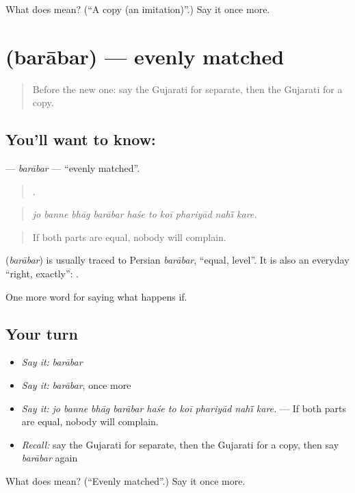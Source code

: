 \begin{tcolorbox}[breakable,colback=teal!4,colframe=teal!35!black,title={Before you move on}]
What does  mean? (\textquotedblleft{}A copy (an imitation)\textquotedblright{}.) Say it once more.
\end{tcolorbox}
\section[\texorpdfstring{\gu{બરાબર} (barābar)}{બરાબર (barābar)}]{ (barābar) — evenly matched}

\label{lesson:GU-C544-barabar}



\begin{quote}
Before the new one: say the Gujarati for separate, then the Gujarati for a copy.
\end{quote}

\subsection*{You'll want to know: }
\textbf{} — \emph{barābar} — \textquotedblleft{}evenly matched\textquotedblright{}.

\begin{quote}
         .
\end{quote}

\begin{quote}
\emph{jo banne bhāg barābar haśe to koī phariyād nahī̃ kare.}
\end{quote}

\begin{quote}
If both parts are equal, nobody will complain.
\end{quote}

\begin{cousinweb}
\textbf{} (\emph{barābar}) is usually traced to Persian \emph{barābar}, \textquotedblleft{}equal, level\textquotedblright{}. It is also an everyday \textquotedblleft{}right, exactly\textquotedblright{}: \textbf{ }.
\end{cousinweb}

\begin{grammarlens}[title={What you've built}]
One more word for saying what happens if.
\end{grammarlens}

\subsection*{Your turn}
\begin{itemize}
\raggedright
  \item \emph{Say it:} \emph{barābar}
  \item \emph{Say it:} \emph{barābar}, once more
  \item \emph{Say it:} \emph{jo banne bhāg barābar haśe to koī phariyād nahī̃ kare.} — If both parts are equal, nobody will complain.
  \item \emph{Recall:} say the Gujarati for separate, then the Gujarati for a copy, then say \emph{barābar} again
\end{itemize}

\begin{tcolorbox}[breakable,colback=teal!4,colframe=teal!35!black,title={Before you move on}]
What does  mean? (\textquotedblleft{}Evenly matched\textquotedblright{}.) Say it once more.
\end{tcolorbox}
